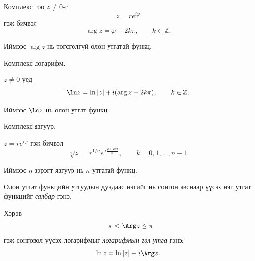 Комплекс тоо $z\neq 0$-г
\[
z=re^{i\varphi}
\]
гэж бичвэл
\[
\arg z=\varphi+2k\pi,\qquad k\in\mathbb{Z}.
\]

Иймээс $\arg z$ нь төгсгөлгүй олон утгатай функц.
\begin{exm}
Комплекс логарифм.
\end{exm}

$z\neq 0$ үед
\[
\Ln z=\ln|z|+i(\arg z+2k\pi),\qquad k\in\mathbb{Z}.
\]

Иймээс $\Ln z$ нь олон утгат функц.
\begin{exm}
Комплекс язгуур.
\end{exm}

$z=re^{i\varphi}$ гэж бичвэл
\[
\sqrt[n]{z}
=
r^{1/n}
e^{\,i\frac{\varphi+2k\pi}{n}},
\qquad k=0,1,\dots,n-1.
\]

Иймээс $n$-зэрэгт язгуур нь $n$ утгатай функц.
\begin{dfn}
Олон утгат функцийн утгуудын дундаас нэгийг нь
сонгон авснаар үүсэх нэг утгат функцийг
\emph{салбар} гэнэ.
\end{dfn}
\begin{dfn}
Хэрэв
\[
-\pi<\Arg z\le \pi
\]
гэж сонговол үүсэх логарифмыг
\emph{логарифмын гол утга} гэнэ:
\[
\ln z=\ln|z|+i\Arg z.
\]
\end{dfn}
